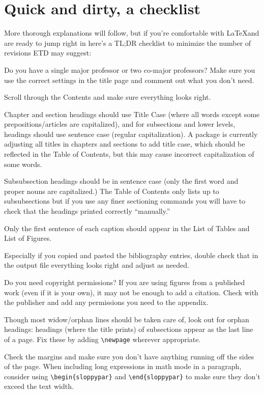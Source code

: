 \chapter{Quick and dirty, a checklist}
More thorough explanations will follow, but if you're comfortable with \LaTeX and are ready to jump right in here's a TL;DR checklist to minimize the number of revisions ETD may suggest:

\begin{todolist}
\item Do you have a single major professor or two co-major professors? Make sure you use the correct settings in the title page and comment out what you don't need.
\item Scroll through the Contents and make sure everything looks right. 
\begin{todolist}
\item Chapter and section headings should use Title Case (where all words except some prepositions/articles are capitalized), and for subsections and lower levels, headings should use sentence case (regular capitalization). A package is currently adjusting all titles in chapters and sections to add title case, which should be reflected in the Table of Contents, but this may cause incorrect capitalization of some words.
\item Subsubsection headings should be in sentence case (only the first word and proper nouns are capitalized.) The Table of Contents only lists up to subsubsections but if you use any finer sectioning commands you will have to check that the headings printed correctly ``manually.''
\item Only the first sentence of each caption should appear in the List of Tables and List of Figures.
\end{todolist}
\item Especially if you copied and pasted the bibliography entries, double check that in the output file everything looks right and adjust as needed.
\item Do you need copyright permissions? If you are using figures from a published work (even if it is your own), it may not be enough to add a citation. Check with the publisher and add any permissions you need to the appendix. 
\item Though most widow/orphan lines should be taken care of, look out for orphan headings: headings (where the title prints) of subsections appear as the last line of a page. Fix these by adding \verb|\newpage| wherever appropriate.
\item Check the margins and make sure you don't have anything running off the sides of the page. When including long expressions in math mode in a paragraph, consider using \verb|\begin{sloppypar}| and \verb|\end{sloppypar}| to make sure they don't exceed the text width. 

\end{todolist}
